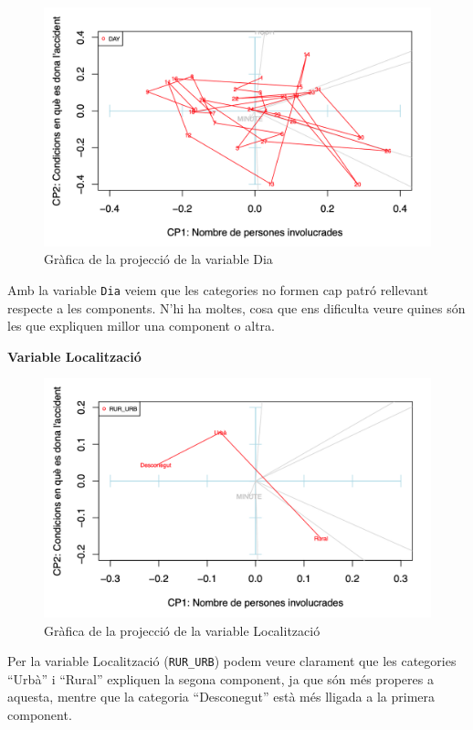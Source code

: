 \documentclass[12pt,longbibliography]{article}
\theoremstyle{definition}
\theoremstyle{remark}
\begin{document}
\begin{figure}[H]
\begin{center}
\includegraphics[width=12cm]{acp7}
\end{center}
\caption{Gràfica de la projecció de la variable Dia}
\label{fig:ACP7}
\end{figure}


Amb la variable \texttt{Dia} veiem que les categories no formen cap patró rellevant respecte a les components. N'hi ha moltes, cosa que ens dificulta veure quines són les que expliquen millor una component o altra.



\textbf{Variable Localització}

\begin{figure}[H]
\begin{center}
\includegraphics[width=12cm]{acp8}
\end{center}
\caption{Gràfica de la projecció de la variable Localització}
\label{fig:ACP8}
\end{figure}


Per la variable Localització (\texttt{RUR\_URB}) podem veure clarament que les categories ``Urbà'' i ``Rural'' expliquen la segona component, ja que són més properes a aquesta, mentre que la categoria ``Desconegut'' està més lligada a la primera component.
\end{document}
